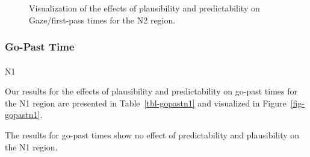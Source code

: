 \documentclass[
  12pt,
  letterpaper,
]{scrreprt}
\makeatletter
\let\oldparagraph\paragraph
\renewcommand{\paragraph}{
    \@ifstar
      \xxxParagraphStar
      \xxxParagraphNoStar
  }
\newcommand{\xxxParagraphStar}[1]{\oldparagraph*{#1}\mbox{}}
\newcommand{\xxxParagraphNoStar}[1]{\oldparagraph{#1}\mbox{}}
\makeatother
\begin{document}
\begin{figure}[htbp]

\caption{\label{fig-gazen2}Visualization of the effects of plausibility
and predictability on Gaze/first-pass times for the N2 region.}


\end{figure}%

\subsubsection{Go-Past Time}\label{go-past-time-1}

\paragraph{N1}\label{n1-6}

Our results for the effects of plausibility and predictability on
go-past times for the N1 region are presented in
Table~\ref{tbl-gopastn1} and visualized in Figure~\ref{fig-gopastn1}.

The results for go-past times show no effect of predictability and
plausibility on the N1 region.
\end{document}
